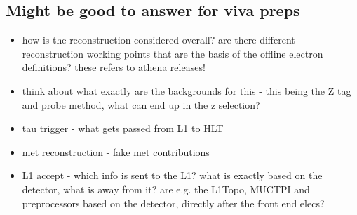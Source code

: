 \subsection{Might be good to answer for viva preps}
\begin{itemize}
    \item how is the reconstruction considered overall? are there different
    reconstruction working points that are the basis of the offline electron definitions? these refers to athena releases!
    \item think about what exactly are the backgrounds for this - this being the Z tag and probe method, what can end up in the z selection?
    \item tau trigger - what gets passed from L1 to HLT
    \item met reconstruction - fake met contributions
    \item L1 accept - which info is sent to the L1? what is exactly based on the detector,  what is away from it? are e.g. the L1Topo, MUCTPI and preprocessors based on the detector, directly after the front end elecs? 
\end{itemize}